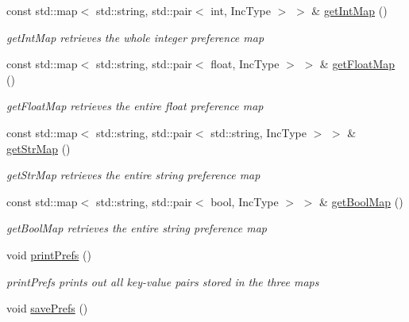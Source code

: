 \begin{DoxyCompactItemize}
\item 
const std\+::map$<$ std\+::string, std\+::pair$<$ int, Inc\+Type $>$ $>$ \& \hyperlink{class_prefs_afd4dc2154410d35f8b68daf2fd4b261e}{get\+Int\+Map} ()
\begin{DoxyCompactList}\small\item\em get\+Int\+Map retrieves the whole integer preference map \end{DoxyCompactList}\item 
const std\+::map$<$ std\+::string, std\+::pair$<$ float, Inc\+Type $>$ $>$ \& \hyperlink{class_prefs_ac9c4890be5513e22acca32ccb71fd695}{get\+Float\+Map} ()
\begin{DoxyCompactList}\small\item\em get\+Float\+Map retrieves the entire float preference map \end{DoxyCompactList}\item 
const std\+::map$<$ std\+::string, std\+::pair$<$ std\+::string, Inc\+Type $>$ $>$ \& \hyperlink{class_prefs_af97b292fad51f096a49a012593f0b6e3}{get\+Str\+Map} ()
\begin{DoxyCompactList}\small\item\em get\+Str\+Map retrieves the entire string preference map \end{DoxyCompactList}\item 
const std\+::map$<$ std\+::string, std\+::pair$<$ bool, Inc\+Type $>$ $>$ \& \hyperlink{class_prefs_a9707513ccb9e1018ab987b8620c961ce}{get\+Bool\+Map} ()
\begin{DoxyCompactList}\small\item\em get\+Bool\+Map retrieves the entire string preference map \end{DoxyCompactList}\item 
\hypertarget{class_prefs_afa1c9b1ef43523e0acd54e41e7dcb55e}{}void \hyperlink{class_prefs_afa1c9b1ef43523e0acd54e41e7dcb55e}{print\+Prefs} ()\label{class_prefs_afa1c9b1ef43523e0acd54e41e7dcb55e}

\begin{DoxyCompactList}\small\item\em print\+Prefs prints out all key-\/value pairs stored in the three maps \end{DoxyCompactList}\item 
\hypertarget{class_prefs_a44f9f3bfff7a83393ccde65d77522dc6}{}void \hyperlink{class_prefs_a44f9f3bfff7a83393ccde65d77522dc6}{save\+Prefs} ()\label{class_prefs_a44f9f3bfff7a83393ccde65d77522dc6}


\end{DoxyCompactItemize}
